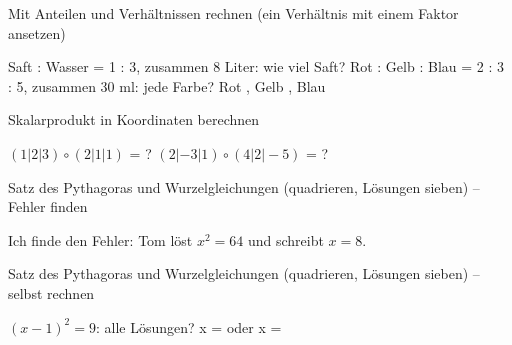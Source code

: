 \begin{aufgabe}{Mit Anteilen und Verhältnissen rechnen (ein Verhältnis mit einem Faktor ansetzen)}
\begin{teile}
\teil Saft : Wasser = 1 : 3, zusammen 8 Liter: wie viel Saft? \leerfeld[l]
\teil Rot : Gelb : Blau = 2 : 3 : 5, zusammen 30 ml: jede Farbe? Rot \leerfeld[ml] , Gelb \leerfeld[ml] , Blau \leerfeld[ml]
\end{teile}
\end{aufgabe}

\begin{aufgabe}{Skalarprodukt in Koordinaten berechnen}
\begin{teile}
\teil $(1 | 2 | 3) \circ (2 | 1 | 1)$ = ?
\teil $(2 | -3 | 1) \circ (4 | 2 | -5)$ = ?
\end{teile}
\end{aufgabe}

\begin{aufgabe}{Satz des Pythagoras und Wurzelgleichungen (quadrieren, Lösungen sieben) – Fehler finden}
\begin{teile}
\teil Ich finde den Fehler: Tom löst $x^2 = 64$ und schreibt $x = 8$.
\end{teile}
\end{aufgabe}

\begin{aufgabe}{Satz des Pythagoras und Wurzelgleichungen (quadrieren, Lösungen sieben) – selbst rechnen}
\begin{teile}
\teil $(x - 1)^2 = 9$: alle Lösungen? x = \leerfeld oder x = \leerfeld
\end{teile}
\end{aufgabe}
